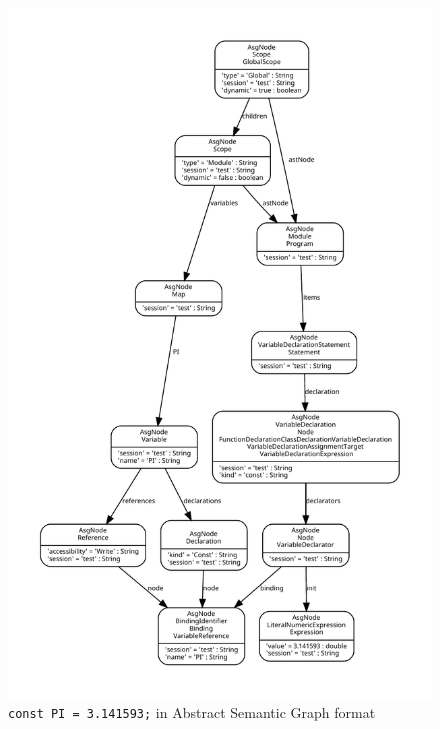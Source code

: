 \begin{figure}[!htb]
	\centering
	\includegraphics[height=\textheight, trim=1cm 1cm 1cm 1cm,clip]{figures/codemodel-rifle-asg.pdf}
	\caption{\texttt{const PI = 3.141593;} in Abstract Semantic Graph format}
	\label{fig:codemodel-rifle-asg}
\end{figure}

